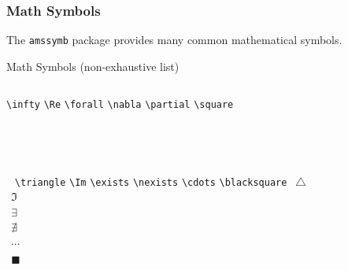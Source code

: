 \begin{frame}[fragile]
\frametitle{Math Symbols}
The \texttt{amssymb} package provides many common mathematical symbols. \\
    \begin{block}{Math Symbols (non-exhaustive list)}
    \begin{columns}
        \verb|\infty| 
        \verb|\Re|
        \verb|\forall|
        \verb|\nabla|
        \verb|\partial|
        \verb|\square|
        $~~$ \infty \\
        $~~$ \Re \\
        $~~$ \forall \\
        $~~$ \nabla \\
        $~~$ \partial \\
        $~~$ \square
        \verb|\triangle| 
        \verb|\Im|
        \verb|\exists|
        \verb|\nexists|
        \verb|\cdots|
        \verb|\blacksquare|
        $~~\triangle$ \\
        $~~\Im$ \\
        $~~\exists$ \\
        $~~\nexists$ \\
        $~~\cdots$ \\
        $~~\blacksquare$
    \end{columns}
\end{block}
\end{frame}



